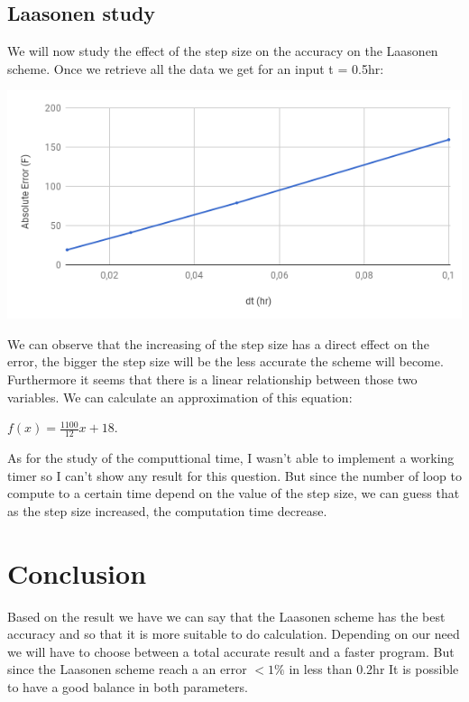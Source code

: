 \documentclass [10 pt, a4 paper]{article}
\begin{document}
\newpage
\subsection{Laasonen study}
We will now study the effect of the step size on the accuracy on the Laasonen scheme.
Once we retrieve all the data we get for an input t = 0.5hr:

\begin{center} 
    \includegraphics[scale=0.5]{Chart/laasonenAE.PNG}
\end{center}

We can observe that the increasing of the step size has a direct effect on the error, the bigger
the step size will be the less accurate the scheme will become. Furthermore it seems that 
there is a linear relationship between those two variables. We can calculate an approximation of this
equation: 

$f(x) = \frac{1100}{12} x + 18$.

As for the study of the computtional time, I wasn't able to implement a working timer so I can't
show any result for this question. But since the number of loop to compute to a certain time depend on the
value of the step size, we can guess that as the step size increased, the computation time decrease.

\section{Conclusion}
Based on the result we have we can say that the Laasonen scheme has the best accuracy and so that
it is more suitable to do calculation. Depending on our need we will have to choose between a total accurate
result and a faster program. But since the Laasonen scheme reach a an error $<1\%$ in less than 0.2hr
It is possible to have a good balance in both parameters.
\end{document}
